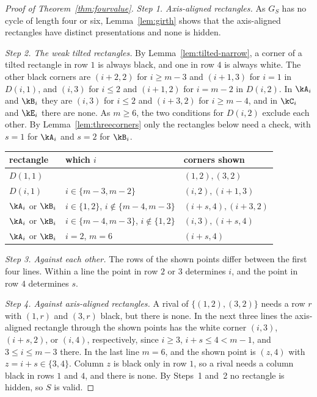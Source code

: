 \begin{proof}[Proof of Theorem~\ref{thm:fourvalue}]
\emph{Step 1. Axis-aligned rectangles.} As $G_S$ has no cycle of length four or six, Lemma~\ref{lem:girth} shows that the axis-aligned rectangles have distinct presentations and none is hidden.

\emph{Step 2. The weak tilted rectangles.} By Lemma~\ref{lem:tilted-narrow}, a corner of a tilted rectangle in row $1$ is always black, and one in row $4$ is always white. The other black corners are $(i+2,2)$ for $i\ge m-3$ and $(i+1,3)$ for $i=1$ in $D(i,1)$, and $(i,3)$ for $i\le2$ and $(i+1,2)$ for $i=m-2$ in $D(i,2)$. In $\kA_i$ and $\kB_i$ they are $(i,3)$ for $i\le2$ and $(i+3,2)$ for $i\ge m-4$, and in $\kC_i$ and $\kE_i$ there are none. As $m\ge6$, the two conditions for $D(i,2)$ exclude each other. By Lemma~\ref{lem:threecorners} only the rectangles below need a check, with $s=1$ for $\kA_i$ and $s=2$ for $\kB_i$.
\begin{center}\small
\begin{tabular}{@{}lll@{}}
\toprule
rectangle & which $i$ & corners shown\\
\midrule
$D(1,1)$ & & $(1,2),(3,2)$\\
$D(i,1)$ & $i\in\{m-3,m-2\}$ & $(i,2),(i+1,3)$\\
$\kA_i$ or $\kB_i$ & $i\in\{1,2\}$, $i\notin\{m-4,m-3\}$ & $(i+s,4),(i+3,2)$\\
$\kA_i$ or $\kB_i$ & $i\in\{m-4,m-3\}$, $i\notin\{1,2\}$ & $(i,3),(i+s,4)$\\
$\kA_i$ or $\kB_i$ & $i=2$, $m=6$ & $(i+s,4)$\\
\bottomrule
\end{tabular}
\end{center}

\emph{Step 3. Against each other.} The rows of the shown points differ between the first four lines. Within a line the point in row $2$ or $3$ determines $i$, and the point in row $4$ determines $s$.

\emph{Step 4. Against axis-aligned rectangles.} A rival of $\{(1,2),(3,2)\}$ needs a row $r$ with $(1,r)$ and $(3,r)$ black, but there is none. In the next three lines the axis-aligned rectangle through the shown points has the white corner $(i,3)$, $(i+s,2)$, or $(i,4)$, respectively, since $i\ge3$, $i+s\le4<m-1$, and $3\le i\le m-3$ there. In the last line $m=6$, and the shown point is $(z,4)$ with $z=i+s\in\{3,4\}$. Column $z$ is black only in row $1$, so a rival needs a column black in rows $1$ and $4$, and there is none. By Steps~1 and~2 no rectangle is hidden, so $S$ is valid.
\end{proof}

